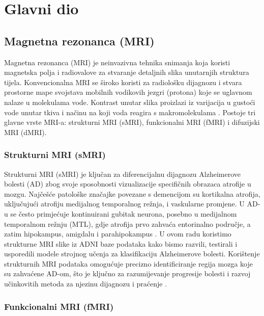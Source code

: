 \documentclass[zavrsnirad]{fer}
\begin{document}
\chapter{Glavni dio}
\label{pog:glavni_dio}

\section{Magnetna rezonanca (MRI)}

Magnetna rezonanca (MRI) je neinvazivna tehnika snimanja koja koristi magnetska polja i radiovalove za stvaranje detaljnih slika unutarnjih struktura tijela. Konvencionalna MRI se široko koristi za radiološku dijagnozu i stvara prostorne mape svojstava mobilnih vodikovih jezgri (protona) koje se uglavnom nalaze u molekulama vode. Kontrast unutar slika proizlazi iz varijacija u gustoći vode unutar tkiva i načinu na koji voda reagira s makromolekulama \cite{Gore2003}. Postoje tri glavne vrste MRI-a: strukturni MRI (sMRI), funkcionalni MRI (fMRI) i difuzijski MRI (dMRI).


\subsection{Strukturni MRI (sMRI)}
Strukturni MRI (sMRI) je ključan za diferencijalnu dijagnozu Alzheimerove bolesti (AD) zbog svoje sposobnosti vizualizacije specifičnih obrazaca atrofije u mozgu. Najčešće patološke značajke povezane s demencijom su kortikalna atrofija, uključujući atrofiju medijalnog temporalnog režnja, i vaskularne promjene. U AD-u se često primjećuje kontinuirani gubitak neurona, posebno u medijalnom temporalnom režnju (MTL), gdje atrofija prvo zahvaća entorinalno područje, a zatim hipokampus, amigdalu i parahipokampus \cite{Promteangtrong2015}. U ovom radu koristimo strukturne MRI slike iz ADNI baze podataka kako bismo razvili, testirali i usporedili modele strojnog učenja za klasifikaciju Alzheimerove bolesti. Korištenje strukturnih MRI podataka omogućuje precizno identificiranje regija mozga koje su zahvaćene AD-om, što je ključno za razumijevanje progresije bolesti i razvoj učinkovitih metoda za njezinu dijagnozu i praćenje \cite{Gonuguntla2022}.


\subsection{Funkcionalni MRI (fMRI)}
\end{document}
